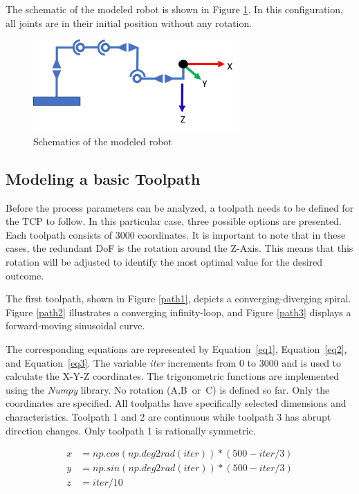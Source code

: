 The schematic of the modeled robot is shown in Figure \ref{schema}. In this configuration, all joints are in their initial position without any rotation.
\begin{figure}[H]
	\centerline{\includegraphics[width=0.7\textwidth]{figures/schema.png}}
	\caption{Schematics of the modeled robot}
	\label{schema}
\end{figure}

\subsection{Modeling a basic Toolpath}\label{MBT}
Before the process parameters can be analyzed, a toolpath needs to be defined for the TCP to follow. In this particular case, three possible options are presented. Each toolpath consists of 3000 coordinates. It is important to note that in these cases, the redundant DoF is the rotation around the Z-Axis. This means that  this rotation will be adjusted to identify the most optimal value for the desired outcome.


The first toolpath, shown in Figure \ref{path1}, depicts a converging-diverging spiral. Figure \ref{path2} illustrates a converging infinity-loop, and Figure \ref{path3} displays a forward-moving sinusoidal curve. 

The corresponding equations are represented by Equation~\ref{eq1}, Equation~\ref{eq2}, and Equation~\ref{eq3}. The variable \textit{iter} increments from 0 to 3000 and is used to calculate the X-Y-Z coordinates. The trigonometric functions are implemented using the \textit{Numpy} library. No rotation (A,B~or~C) is defined so far. Only the coordinates are specified. All toolpaths have specifically selected dimensions and characteristics. Toolpath 1 and 2 are continuous while toolpath 3 has abrupt direction changes. Only toolpath 1 is rationally symmetric. 


\begin{equation}\label{eq1}
\begin{split}
x &= np.cos(np.deg2rad(iter)) * (500 - iter / 3)\\
y &= np.sin(np.deg2rad(iter)) * (500 - iter / 3)\\
z &= iter / 10
\end{split}
\end{equation}


